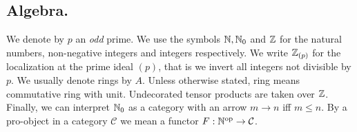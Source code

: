 \subsection*{Algebra.}
We denote by $p$ an \textit{odd} prime. We use the symbols $\mathbb{N}, \mathbb{N}_0$ and $\mathbb{Z}$
for the natural numbers, non-negative integers and integers respectively. We write
$\mathbb{Z}_{(p)}$ for the localization at the prime ideal $(p)$, that is we invert all integers
not divisible by $p$. We usually denote rings by $A$. Unless otherwise stated, ring
means commutative ring with unit. Undecorated tensor products are taken
over $\mathbb{Z}$. Finally, we can interpret $\mathbb{N}_0$ as a category with an arrow
$m\to n$ iff $m\le n$. By a pro-object in a category $\mathcal{C}$
we mean a functor $F:\mathbb{N}^{\mathrm{op}}\to \mathcal{C}$.